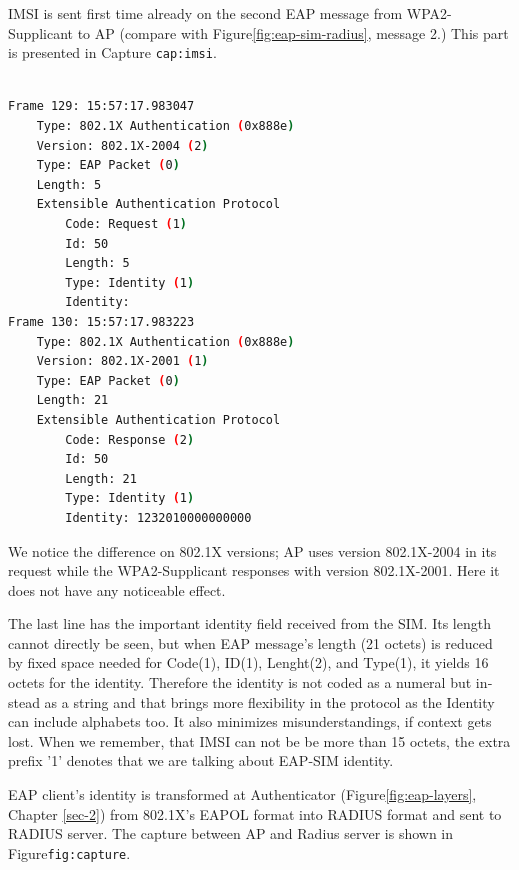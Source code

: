 \documentclass[12pt,a4paper,english]{tutthesis}
\begin{document}
\begin{otherlanguage}{english}
IMSI is sent first time already on the second EAP message from 
WPA2-Supplicant to AP (compare with Figure\ref{fig:eap-sim-radius}, message 2.)
This part is presented in Capture \texttt{cap:imsi}.



\begin{lstlisting}[language=bash,
  label=capimsi,
  caption={First indication of IMSI}
]

Frame 129: 15:57:17.983047
    Type: 802.1X Authentication (0x888e)
    Version: 802.1X-2004 (2)
    Type: EAP Packet (0)
    Length: 5
    Extensible Authentication Protocol
        Code: Request (1)
        Id: 50
        Length: 5
        Type: Identity (1)
        Identity: 
Frame 130: 15:57:17.983223
    Type: 802.1X Authentication (0x888e)
    Version: 802.1X-2001 (1)
    Type: EAP Packet (0)
    Length: 21
    Extensible Authentication Protocol
        Code: Response (2)
        Id: 50
        Length: 21
        Type: Identity (1)
        Identity: 1232010000000000
\end{lstlisting}
\normalsize

We notice the difference on 802.1X versions; AP uses version
802.1X-2004 in its request while the WPA2-Supplicant
responses with version 802.1X-2001. Here it does not have any
noticeable effect. 

The last line has the important identity field received from the SIM.
Its length cannot directly be seen, but when EAP message's length (21
octets) is reduced by fixed space needed for Code(1), ID(1),
Lenght(2), and Type(1), it yields 16 octets for the
identity. Therefore the identity is not coded as a 
numeral but instead as a string and that brings more flexibility in
the protocol as the Identity can include alphabets too. It also
minimizes misunderstandings, if context gets lost. 
When we remember, that IMSI can not be be more than 15 octets, the extra prefix '1'
denotes that we are talking about EAP-SIM identity. 





EAP client's identity is transformed at Authenticator
(Figure\ref{fig:eap-layers}, Chapter \ref{sec-2}) from 802.1X's 
EAPOL format  into RADIUS format and
sent to RADIUS server. The capture between AP and Radius server is
shown
in Figure\texttt{fig:capture}.







\end{otherlanguage}
\end{document}
